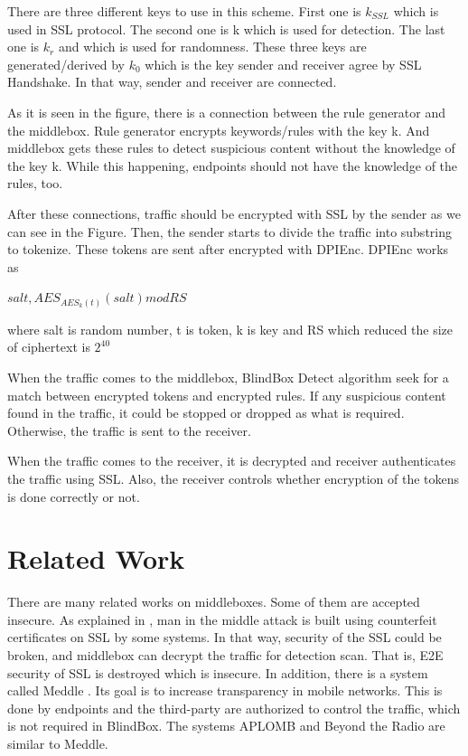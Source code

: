 \documentclass{winslabreport}
\begin{document}
There are three different keys to use in this scheme. First one is $k_{SSL}$ which is used in SSL protocol. The second one is k which is used for detection. The last one is $k_r$ and which is used for randomness. These three keys are generated/derived by $k_0$ which is the key sender and receiver agree by SSL Handshake. In that way, sender and receiver are connected.

As it is seen in the figure, there is a connection between the rule generator and the middlebox. Rule generator encrypts keywords/rules with the key k. And middlebox gets these rules to detect suspicious content without the knowledge of the key k. While this happening, endpoints should not have the knowledge of the rules, too.

After these connections, traffic should be encrypted with SSL by the sender as we can see in the Figure. Then, the sender starts to divide the traffic into substring to tokenize. These tokens are sent after encrypted with DPIEnc. DPIEnc works as

\begin{center}
	$salt ,  AES_{AES_k (t)}(salt)  mod RS$
\end{center}

where salt is random number, t is token, k is key and  RS which reduced the size of ciphertext is $2^{40}$

When the traffic comes to the middlebox, BlindBox Detect algorithm seek for a match between encrypted tokens and encrypted rules. If any suspicious content found in the traffic, it could be stopped or dropped as what is required. Otherwise, the traffic is sent to the receiver.

When the traffic comes to the receiver, it is decrypted and receiver authenticates the traffic using SSL. Also, the receiver controls whether encryption of the tokens is done correctly or not. 

\section{Related Work}

There are many related works on middleboxes. Some of them are accepted insecure. As explained in \cite{SSL} , man in the middle attack is built using counterfeit certificates on SSL by some systems. In that way, security of the SSL could be broken, and middlebox can decrypt the traffic for detection scan. That is, E2E security of SSL is destroyed which is insecure. In addition, there is a system called Meddle \cite{Traffic}. Its goal is to increase transparency in mobile networks. This is done by endpoints and the third-party are authorized to control the traffic, which is not required in BlindBox. The systems APLOMB \cite{Network} and Beyond the Radio \cite{48} are similar to Meddle.
\end{document}
